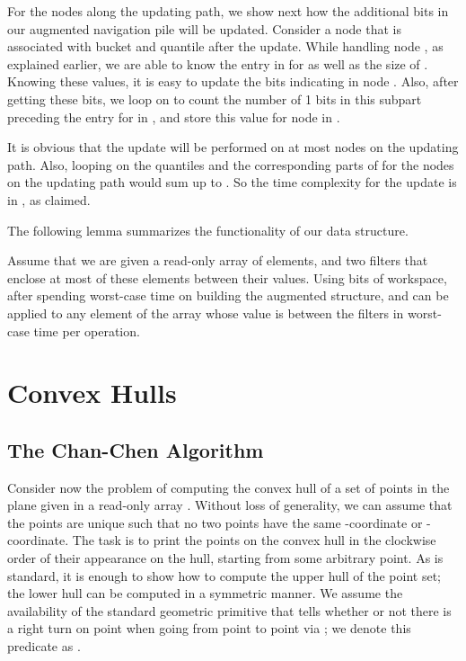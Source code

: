 \documentclass[final,onetabnum,onefignum,onethmnum]{siamltex}
\newcommand{\Insert}{\mbox{}}
\newcommand{\Extract}{\mbox{}}
\begin{document}
For the nodes along the updating path, we show next how the additional
bits in our augmented navigation pile will be updated.  Consider a
node  that is associated with bucket  and quantile  after the update.
While handling node , as explained earlier, we are able to know the
entry in  for  as
well as the size of .  Knowing these values,
it is easy to update the bits indicating  in
node . Also, after getting these bits, we loop on
 to count the number of 1 bits in this subpart
preceding the entry for  in
, and store this value for node  in .

It is obvious that the update will be performed on at most  nodes on
the updating path. Also, looping on the quantiles and the
corresponding parts of  for the nodes on the updating
path would sum up to . So the time complexity for the update is in , as claimed.

The following lemma summarizes the functionality of our data structure.


\begin{lemma}
Assume that we are given a read-only array of  elements, and two
filters that enclose at most  of these elements between their
values.  Using  bits of workspace, after spending 
worst-case time on building the augmented structure, \Insert{} and
\Extract{} can be applied to any element of the array whose value is
between the filters in  worst-case time per operation.
\end{lemma}


\section{Convex Hulls}
\label{ch}

\subsection{The Chan-Chen Algorithm}

Consider now the problem of computing the convex hull of a set
of  points in the plane given in a read-only array . Without loss of generality,
we can assume that the points are unique such that no two
points have the same -coordinate or -coordinate. The task is to
print the points on the convex hull in the clockwise order of their
appearance on the hull, starting from some arbitrary point. As is
standard, it is enough to show how to compute the upper hull of the
point set; the lower hull can be computed in a symmetric manner.
We assume the availability of the standard geometric primitive that
tells whether or not there is a right turn on point  when going from
point  to point  via ; we denote this predicate as
.
\end{document}
